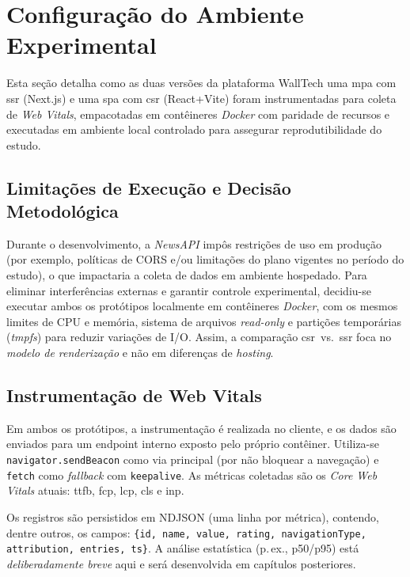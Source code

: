 \section{Configuração do Ambiente Experimental}
\label{sec:ambiente-experimental}

Esta seção detalha como as duas versões da plataforma WallTech uma \acrshort{mpa} com \acrshort{ssr} (Next.js) e uma \acrshort{spa} com \acrshort{csr} (React+Vite) foram instrumentadas para coleta de \textit{Web Vitals}, empacotadas em contêineres \textit{Docker} com paridade de recursos e executadas em ambiente local controlado para assegurar reprodutibilidade do estudo.

\subsection{Limitações de Execução e Decisão Metodológica}
\label{ssec:limitacoes-execucao}

Durante o desenvolvimento, a \textit{NewsAPI} impôs restrições de uso em produção (por exemplo, políticas de CORS e/ou limitações do plano vigentes no período do estudo), o que impactaria a coleta de dados em ambiente hospedado. Para eliminar interferências externas e garantir controle experimental, decidiu-se executar ambos os protótipos localmente em contêineres \textit{Docker}, com os mesmos limites de CPU e memória, sistema de arquivos \textit{read-only} e partições temporárias (\textit{tmpfs}) para reduzir variações de I/O. Assim, a comparação \acrshort{csr}~vs.~\acrshort{ssr} foca no \textit{modelo de renderização} e não em diferenças de \textit{hosting}.

\subsection{Instrumentação de Web Vitals}
\label{ssec:instrumentacao-webvitals}

Em ambos os protótipos, a instrumentação é realizada no cliente, e os dados são enviados para um endpoint interno exposto pelo próprio contêiner. Utiliza-se \texttt{navigator.sendBeacon} como via principal (por não bloquear a navegação) e \texttt{fetch} como \textit{fallback} com \texttt{keepalive}. As métricas coletadas são os \textit{Core Web Vitals} atuais: \acrshort{ttfb}, \acrshort{fcp}, \acrshort{lcp}, \acrshort{cls} e \acrshort{inp}.

Os registros são persistidos em NDJSON (uma linha por métrica), contendo, dentre outros, os campos:
\texttt{\{id, name, value, rating, navigationType, attribution, entries, ts\}}. A análise estatística (p.\,ex., p50/p95) está \textit{deliberadamente breve} aqui e será desenvolvida em capítulos posteriores.

